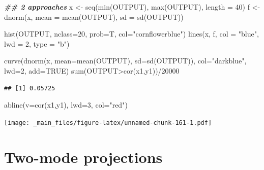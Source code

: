 \documentclass[
  notitlepage,
  onecolumn,
  openany]{book}
\newenvironment{Shaded}{\begin{snugshade}}{\end{snugshade}}
\newcommand{\AttributeTok}[1]{\textcolor[rgb]{0.77,0.63,0.00}{#1}}
\newcommand{\ConstantTok}[1]{\textcolor[rgb]{0.00,0.00,0.00}{#1}}
\newcommand{\DecValTok}[1]{\textcolor[rgb]{0.00,0.00,0.81}{#1}}
\newcommand{\DocumentationTok}[1]{\textcolor[rgb]{0.56,0.35,0.01}{\textbf{\textit{#1}}}}
\newcommand{\FunctionTok}[1]{\textcolor[rgb]{0.00,0.00,0.00}{#1}}
\newcommand{\NormalTok}[1]{#1}
\newcommand{\OtherTok}[1]{\textcolor[rgb]{0.56,0.35,0.01}{#1}}
\newcommand{\SpecialCharTok}[1]{\textcolor[rgb]{0.00,0.00,0.00}{#1}}
\newcommand{\StringTok}[1]{\textcolor[rgb]{0.31,0.60,0.02}{#1}}
\begin{document}
\begin{Shaded}
\begin{Highlighting}[]
\DocumentationTok{\#\# 2 approaches}
\NormalTok{x }\OtherTok{\textless{}{-}} \FunctionTok{seq}\NormalTok{(}\FunctionTok{min}\NormalTok{(OUTPUT), }\FunctionTok{max}\NormalTok{(OUTPUT), }\AttributeTok{length =} \DecValTok{40}\NormalTok{)}
\NormalTok{f }\OtherTok{\textless{}{-}} \FunctionTok{dnorm}\NormalTok{(x, }\AttributeTok{mean =} \FunctionTok{mean}\NormalTok{(OUTPUT), }\AttributeTok{sd =} \FunctionTok{sd}\NormalTok{(OUTPUT))}

\FunctionTok{hist}\NormalTok{(OUTPUT, }\AttributeTok{nclass=}\DecValTok{20}\NormalTok{, }\AttributeTok{prob=}\NormalTok{T, }\AttributeTok{col=}\StringTok{"cornflowerblue"}\NormalTok{)}
\FunctionTok{lines}\NormalTok{(x, f, }\AttributeTok{col =} \StringTok{"blue"}\NormalTok{, }\AttributeTok{lwd =} \DecValTok{2}\NormalTok{, }\AttributeTok{type =} \StringTok{"b"}\NormalTok{)}

\FunctionTok{curve}\NormalTok{(}\FunctionTok{dnorm}\NormalTok{(x, }\AttributeTok{mean=}\FunctionTok{mean}\NormalTok{(OUTPUT), }\AttributeTok{sd=}\FunctionTok{sd}\NormalTok{(OUTPUT)), }
      \AttributeTok{col=}\StringTok{"darkblue"}\NormalTok{, }\AttributeTok{lwd=}\DecValTok{2}\NormalTok{, }\AttributeTok{add=}\ConstantTok{TRUE}\NormalTok{)}
\FunctionTok{sum}\NormalTok{(OUTPUT}\SpecialCharTok{\textgreater{}}\FunctionTok{cor}\NormalTok{(x1,y1))}\SpecialCharTok{/}\DecValTok{20000}
\end{Highlighting}
\end{Shaded}

\begin{verbatim}
## [1] 0.05725
\end{verbatim}

\begin{Shaded}
\begin{Highlighting}[]
\FunctionTok{abline}\NormalTok{(}\AttributeTok{v=}\FunctionTok{cor}\NormalTok{(x1,y1), }\AttributeTok{lwd=}\DecValTok{3}\NormalTok{, }\AttributeTok{col=}\StringTok{"red"}\NormalTok{)}
\end{Highlighting}
\end{Shaded}

\texttt{[image: \_main\_files/figure-latex/unnamed-chunk-161-1.pdf]}

\hypertarget{two-mode-projections}{%
\chapter{Two-mode projections}\label{two-mode-projections}}
\end{document}
